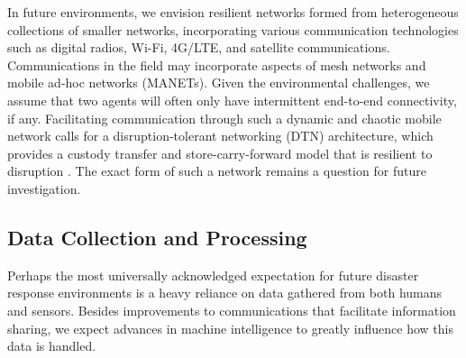 \documentclass[]             %
{NASA}                       %
\theoremstyle{definition}
\begin{document}
In future environments, we envision resilient networks formed from
heterogeneous collections of smaller networks, incorporating various
communication technologies such as digital radios, Wi-Fi, 4G/LTE, and
satellite communications. Communications in the field may incorporate
aspects of mesh networks and mobile ad-hoc networks (MANETs). Given
the environmental challenges, we assume that two agents will often
only have intermittent end-to-end connectivity, if any. Facilitating
communication through such a dynamic and chaotic mobile network calls
for a disruption-tolerant networking (DTN) architecture, which
provides a custody transfer and store-carry-forward model that is
resilient to disruption \cite{2021:intro-dtn}. The exact form of such
a network remains a question for future investigation.

\subsection{Data Collection and Processing}
\label{ssec:data-collection}
Perhaps the most universally acknowledged expectation for future
disaster response environments is a heavy reliance on data
gathered from both humans and sensors. Besides improvements to
communications that facilitate information sharing, we expect advances
in machine intelligence to greatly influence how this data is
handled.
\end{document}
